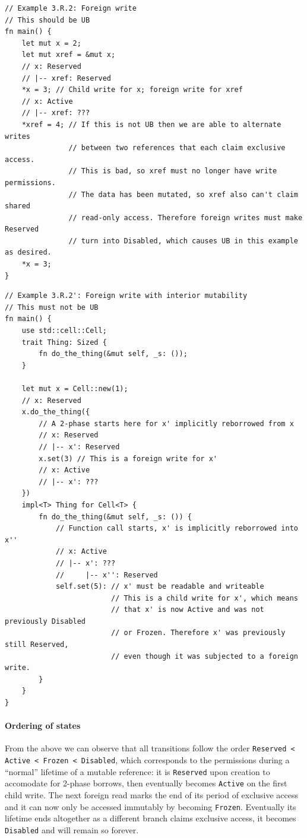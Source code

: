 \documentclass[a4paper,11pt]{article}
\theoremstyle{plain}
\theoremstyle{definition}
\theoremstyle{remark}
\newcommand{\tperm}[1]{\texttt{#1}}
\begin{document}
\begin{lstlisting}
// Example 3.R.2: Foreign write
// This should be UB
fn main() {
    let mut x = 2;
    let mut xref = &mut x;
    // x: Reserved
    // |-- xref: Reserved
    *x = 3; // Child write for x; foreign write for xref
    // x: Active
    // |-- xref: ???
    *xref = 4; // If this is not UB then we are able to alternate writes
               // between two references that each claim exclusive access.
               // This is bad, so xref must no longer have write permissions.
               // The data has been mutated, so xref also can't claim shared
               // read-only access. Therefore foreign writes must make Reserved
               // turn into Disabled, which causes UB in this example as desired.
    *x = 3;
}
\end{lstlisting}

\begin{lstlisting}
// Example 3.R.2': Foreign write with interior mutability
// This must not be UB
fn main() {
    use std::cell::Cell;
    trait Thing: Sized {
        fn do_the_thing(&mut self, _s: ());
    }

    let mut x = Cell::new(1);
    // x: Reserved
    x.do_the_thing({
        // A 2-phase starts here for x' implicitly reborrowed from x
        // x: Reserved
        // |-- x': Reserved
        x.set(3) // This is a foreign write for x'
        // x: Active
        // |-- x': ???
    })
    impl<T> Thing for Cell<T> {
        fn do_the_thing(&mut self, _s: ()) {
            // Function call starts, x' is implicitly reborrowed into x''
            // x: Active
            // |-- x': ???
            //     |-- x'': Reserved
            self.set(5): // x' must be readable and writeable
                         // This is a child write for x', which means
                         // that x' is now Active and was not previously Disabled
                         // or Frozen. Therefore x' was previously still Reserved,
                         // even though it was subjected to a foreign write.
        }
    }
}
\end{lstlisting}

\paragraph*{Ordering of states}

From the above we can observe that all transitions follow the order
\tperm{Reserved < Active < Frozen < Disabled}, which corresponds to the permissions
during a ``normal'' lifetime of a mutable reference: it is \tperm{Reserved} upon creation
to accomodate for 2-phase borrows, then eventually becomes \tperm{Active} on the first
child write. The next foreign read marks the end of its period of exclusive access
and it can now only be accessed immutably by becoming \tperm{Frozen}. Eventually its
lifetime ends altogether as a different branch claims exclusive access, it
becomes \tperm{Disabled} and will remain so forever.
\end{document}
